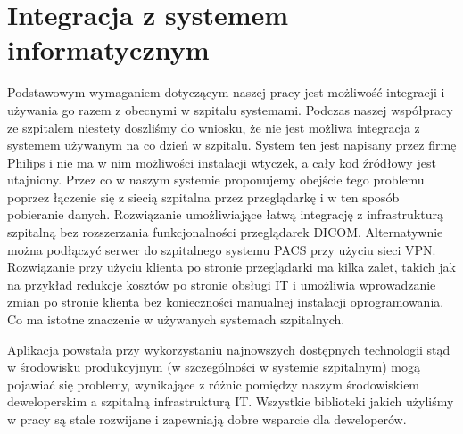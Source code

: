\documentclass[a4paper,11pt,twoside]{report}
\theoremstyle{definition}
\begin{document}
\section{Integracja z systemem informatycznym}
Podstawowym wymaganiem dotyczącym naszej pracy jest możliwość integracji i używania go razem z obecnymi w szpitalu systemami. Podczas naszej współpracy ze szpitalem niestety doszliśmy do wniosku, że nie jest możliwa integracja z systemem używanym na co dzień w szpitalu. System ten jest napisany przez firmę Philips i nie ma w nim możliwości instalacji wtyczek, a cały kod źródłowy jest utajniony. Przez co w naszym systemie proponujemy obejście tego problemu poprzez łączenie się z siecią szpitalna przez przeglądarkę i w ten sposób pobieranie danych. Rozwiązanie umożliwiające łatwą integrację z infrastrukturą szpitalną bez rozszerzania funkcjonalności przeglądarek DICOM. Alternatywnie można podłączyć serwer do szpitalnego systemu PACS przy użyciu sieci VPN. 
Rozwiązanie przy użyciu klienta po stronie przeglądarki ma kilka zalet, takich jak na przykład redukcje kosztów po stronie obsługi IT i umożliwia wprowadzanie zmian po stronie klienta bez konieczności manualnej instalacji oprogramowania. Co ma istotne znaczenie w używanych systemach szpitalnych.
\par
Aplikacja powstała przy wykorzystaniu najnowszych dostępnych technologii stąd w środowisku produkcyjnym (w szczególności w systemie szpitalnym) mogą pojawiać się problemy, wynikające z różnic pomiędzy naszym środowiskiem deweloperskim a szpitalną infrastrukturą IT. Wszystkie biblioteki jakich użyliśmy w pracy są stale rozwijane i zapewniają dobre wsparcie dla deweloperów. 
 
\end{document}
